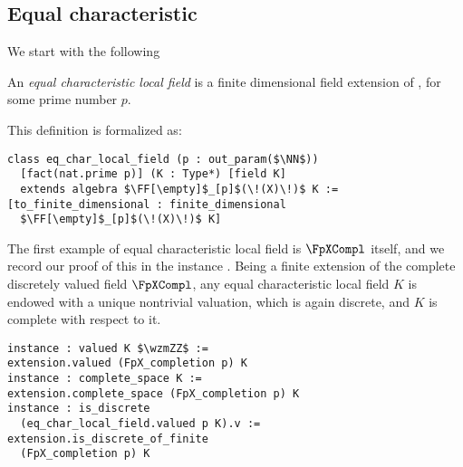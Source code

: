 \documentclass[sigplan,10pt,anonymous,review]{acmart}
\begin{document}
\subsection{Equal characteristic}\label{subsec:eq_char}
We start with the following
\begin{definition}\label{def:eq_char_local_field}
An \emph{equal characteristic local field} is a finite dimensional field extension of \FpXCompl, for some prime number $p$.
\end{definition}
This definition is formalized as\href{https://github.com/LCFT-Lean/local_fields/blob/76ad487d09babdb0018f394a5634526637ee014a/src/eq_characteristic/basic.lean#L354}{\extlink}:
\begin{lstlisting}
class eq_char_local_field (p : out_param($\NN$)) 
  [fact(nat.prime p)] (K : Type*) [field K] 
  extends algebra $\FF[\empty]$_[p]$(\!(X)\!)$ K :=
[to_finite_dimensional : finite_dimensional 
  $\FF[\empty]$_[p]$(\!(X)\!)$ K]
\end{lstlisting}

The first example of equal characteristic local field is $\FpXCompl$ itself, and we record our proof of this in the instance \href{https://github.com/LCFT-Lean/local_fields/blob/76ad487d09babdb0018f394a5634526637ee014a/src/eq_characteristic/basic.lean#L435}{\extlink}. Being a finite extension of the complete discretely valued field $\FpXCompl$, any equal characteristic  local field $K$ is endowed with a unique nontrivial valuation, which is again discrete, and $K$ is complete with respect to it.
\begin{lstlisting}
instance : valued K $\wzmZZ$ := 
extension.valued (FpX_completion p) K
instance : complete_space K := 
extension.complete_space (FpX_completion p) K
instance : is_discrete 
  (eq_char_local_field.valued p K).v := 
extension.is_discrete_of_finite 
  (FpX_completion p) K
\end{lstlisting}
\end{document}

